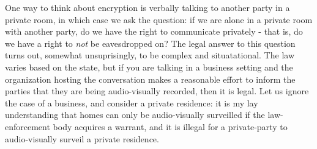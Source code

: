 \documentclass[11pt]{article}
\begin{document}
One way to think about encryption is verbally talking to another party in a private room, in which case we ask the question: if we are alone in a private room with another party, do we have the right to communicate privately - that is, do we have a right to \textit{not} be eavesdropped on?
The legal answer to this question turns out, somewhat unsuprisingly, to be complex and situatational.
The law varies based on the state, but if you are talking in a business setting and the organization hosting the conversation makes a reasonable effort to inform the parties that they are being audio-visually recorded, then it is legal.
Let us ignore the case of a business, and consider a private residence: it is my lay understanding that homes can only be audio-visually surveilled if the law-enforcement body acquires a warrant, and it is illegal for a private-party to audio-visually surveil a private residence.


%
%
\end{document}
